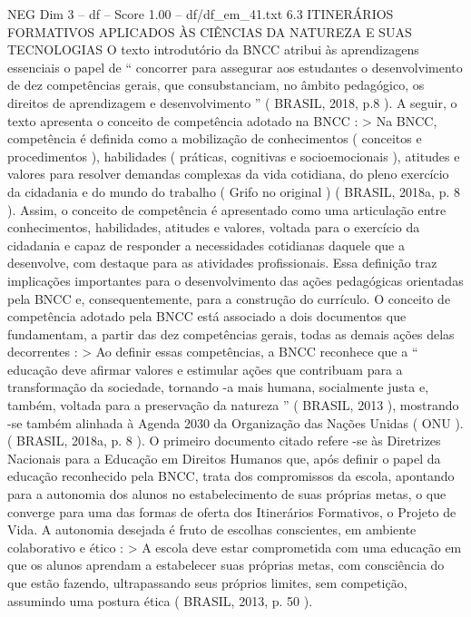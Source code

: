 \begin{textsample}{NEG Dim 3 – df – Score 1.00 – df/df\_em\_41.txt}  \label{ex:f3_neg_166}
6.3 ITINERÁRIOS FORMATIVOS APLICADOS ÀS CIÊNCIAS DA NATUREZA E SUAS TECNOLOGIAS O texto introdutório da BNCC atribui às aprendizagens essenciais o papel de “ concorrer para assegurar aos estudantes o desenvolvimento de dez competências gerais, que consubstanciam, no âmbito pedagógico, os direitos de aprendizagem e desenvolvimento ” ( BRASIL, 2018, p.8 ).
A seguir, o texto apresenta o conceito de competência adotado na BNCC : > Na BNCC, competência é definida como a mobilização de conhecimentos ( conceitos e procedimentos ), habilidades ( práticas, cognitivas e socioemocionais ), atitudes e valores para resolver demandas complexas da vida cotidiana, do pleno exercício da cidadania e do mundo do trabalho ( Grifo no original ) ( BRASIL, 2018a, p. 8 ).
Assim, o conceito de competência é apresentado como uma articulação entre conhecimentos, habilidades, atitudes e valores, voltada para o exercício da cidadania e capaz de responder a necessidades cotidianas daquele que a desenvolve, com destaque para as atividades profissionais.
Essa definição traz implicações importantes para o desenvolvimento das ações pedagógicas orientadas pela BNCC e, consequentemente, para a construção do currículo.
O conceito de competência adotado pela BNCC está associado a dois documentos que fundamentam, a partir das dez competências gerais, todas as demais ações delas decorrentes : > Ao definir essas competências, a BNCC reconhece que a “ educação deve afirmar valores e estimular ações que contribuam para a transformação da sociedade, tornando -a mais humana, socialmente justa e, também, voltada para a preservação da natureza ” ( BRASIL, 2013 ), mostrando -se também alinhada à Agenda 2030 da Organização das Nações Unidas ( ONU ). ( BRASIL, 2018a, p. 8 ).
O primeiro documento citado refere -se às Diretrizes Nacionais para a Educação em Direitos Humanos que, após definir o papel da educação reconhecido pela BNCC, trata dos compromissos da escola, apontando para a autonomia dos alunos no estabelecimento de suas próprias metas, o que converge para uma das formas de oferta dos Itinerários Formativos, o Projeto de Vida.
A autonomia desejada é fruto de escolhas conscientes, em ambiente colaborativo e ético : > A escola deve estar comprometida com uma educação em que os alunos aprendam a estabelecer suas próprias metas, com consciência do que estão fazendo, ultrapassando seus próprios limites, sem competição, assumindo uma postura ética ( BRASIL, 2013, p. 50 ).

\end{textsample}
